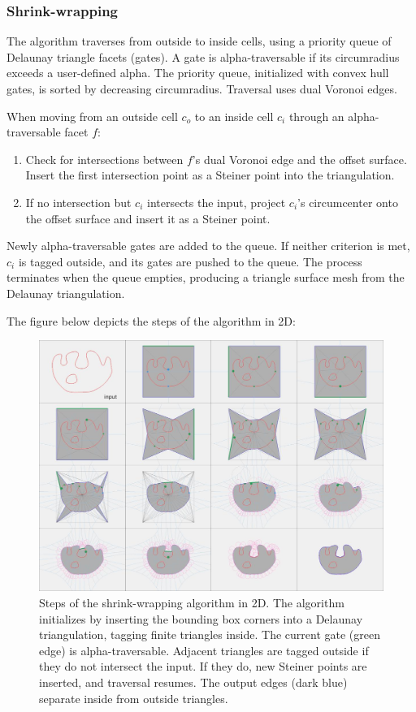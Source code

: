\documentclass[12pt]{article}
\begin{document}
\subsubsection{Shrink-wrapping}
The algorithm traverses from outside to inside cells, using a priority queue of
Delaunay triangle facets (gates). A gate is alpha-traversable if its circumradius
exceeds a user-defined alpha. The priority queue, initialized with convex hull
gates, is sorted by decreasing circumradius. Traversal uses dual Voronoi edges.

When moving from an outside cell \( c_o \) to an inside cell \( c_i \) through
an alpha-traversable facet \( f \):

\begin{enumerate}
    \item Check for intersections between \( f \)'s dual Voronoi edge and
    the offset surface. Insert the first intersection point as a Steiner point
    into the triangulation.
    \item If no intersection but \( c_i \) intersects the input, project
    \( c_i \)'s circumcenter onto the offset surface and insert it as a Steiner point.
\end{enumerate}

Newly alpha-traversable gates are added to the queue. If neither criterion is
met, \( c_i \) is tagged outside, and its gates are pushed to the queue. The
process terminates when the queue empties, producing a triangle surface mesh from
 the Delaunay triangulation.

The figure below depicts the steps of the algorithm in 2D:
\begin{figure}[H]
    \centering
        \centering
        \includegraphics[width=\textwidth]{images/alpha-wrapping-steps.jpg}
        \caption{Steps of the shrink-wrapping algorithm in 2D. The algorithm
        initializes by inserting the bounding box corners into a Delaunay
        triangulation, tagging finite triangles inside. The current gate (green
        edge) is alpha-traversable. Adjacent triangles are tagged outside if
        they do not intersect the input. If they do, new Steiner points are
        inserted, and traversal resumes. The output edges (dark blue) separate
        inside from outside triangles.
        }
\end{figure}
\end{document}
